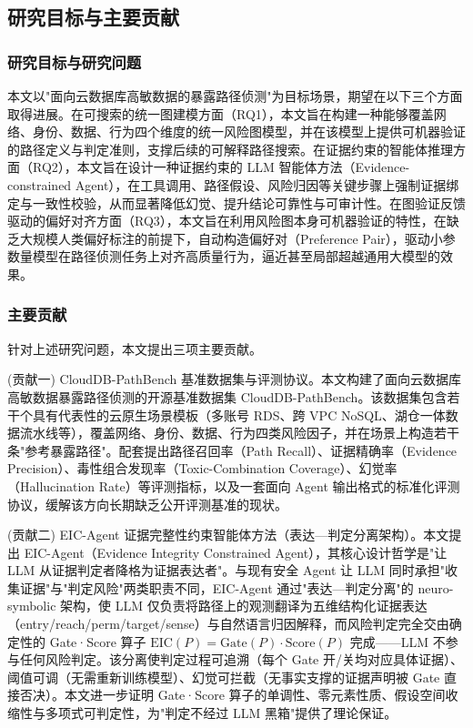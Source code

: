 \documentclass[a4paper,12pt]{ctexart}
\begin{document}
\subsection{研究目标与主要贡献}

\subsubsection{研究目标与研究问题}

本文以"面向云数据库高敏数据的暴露路径侦测"为目标场景，期望在以下三个方面取得进展。在可搜索的统一图建模方面（RQ1），本文旨在构建一种能够覆盖网络、身份、数据、行为四个维度的统一风险图模型，并在该模型上提供可机器验证的路径定义与判定准则，支撑后续的可解释路径搜索。在证据约束的智能体推理方面（RQ2），本文旨在设计一种证据约束的 LLM 智能体方法（Evidence-constrained Agent），在工具调用、路径假设、风险归因等关键步骤上强制证据绑定与一致性校验，从而显著降低幻觉、提升结论可靠性与可审计性。在图验证反馈驱动的偏好对齐方面（RQ3），本文旨在利用风险图本身可机器验证的特性，在缺乏大规模人类偏好标注的前提下，自动构造偏好对（Preference Pair），驱动小参数量模型在路径侦测任务上对齐高质量行为，逼近甚至局部超越通用大模型的效果。

\subsubsection{主要贡献}

针对上述研究问题，本文提出三项主要贡献。

(贡献一) CloudDB-PathBench 基准数据集与评测协议。本文构建了面向云数据库高敏数据暴露路径侦测的开源基准数据集 CloudDB-PathBench。该数据集包含若干个具有代表性的云原生场景模板（多账号 RDS、跨 VPC NoSQL、湖仓一体数据流水线等），覆盖网络、身份、数据、行为四类风险因子，并在场景上构造若干条"参考暴露路径"。配套提出路径召回率（Path Recall）、证据精确率（Evidence Precision）、毒性组合发现率（Toxic-Combination Coverage）、幻觉率（Hallucination Rate）等评测指标，以及一套面向 Agent 输出格式的标准化评测协议，缓解该方向长期缺乏公开评测基准的现状。

(贡献二) EIC-Agent 证据完整性约束智能体方法（表达—判定分离架构）。本文提出 EIC-Agent（Evidence Integrity Constrained Agent），其核心设计哲学是"让 LLM 从证据判定者降格为证据表达者"。与现有安全 Agent 让 LLM 同时承担"收集证据"与"判定风险"两类职责不同，EIC-Agent 通过"表达—判定分离"的 neuro-symbolic 架构，使 LLM 仅负责将路径上的观测翻译为五维结构化证据表达（entry/reach/perm/target/sense）与自然语言归因解释，而风险判定完全交由确定性的 Gate·Score 算子 $\mathrm{EIC}(P)=\mathrm{Gate}(P)\cdot\mathrm{Score}(P)$ 完成——LLM 不参与任何风险判定。该分离使判定过程可追溯（每个 Gate 开/关均对应具体证据）、阈值可调（无需重新训练模型）、幻觉可拦截（无事实支撑的证据声明被 Gate 直接否决）。本文进一步证明 Gate·Score 算子的单调性、零元素性质、假设空间收缩性与多项式可判定性，为"判定不经过 LLM 黑箱"提供了理论保证。
\end{document}
